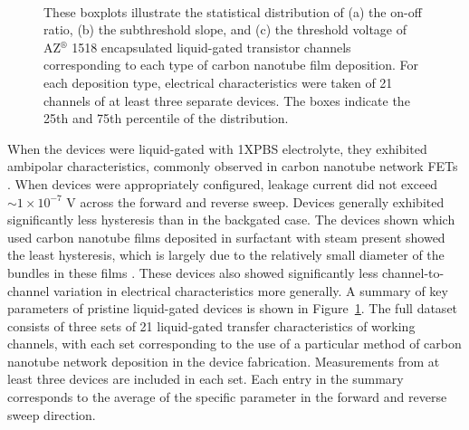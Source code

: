 \documentclass[
  a4paper,
]{scrbook}
\begin{document}
\begin{figure}
\begin{minipage}[t]{0.47\linewidth}
{{}

}

\subcaption{\label{fig-threshold-voltage}}
\end{minipage}%
%
\begin{minipage}[t]{0.26\linewidth}

{\centering 

~

}

\end{minipage}%

\caption{\label{fig-sweep-parameters}These boxplots illustrate the
statistical distribution of (a) the on-off ratio, (b) the subthreshold
slope, and (c) the threshold voltage of AZ\(^\circledR\) 1518
encapsulated liquid-gated transistor channels corresponding to each type
of carbon nanotube film deposition. For each deposition type, electrical
characteristics were taken of 21 channels of at least three separate
devices. The boxes indicate the 25th and 75th percentile of the
distribution.}

\end{figure}

When the devices were liquid-gated with 1XPBS electrolyte, they
exhibited ambipolar characteristics, commonly observed in carbon
nanotube network FETs
\autocite{Kauffman2008,Heller2009,JongYu2009,Derenskyi2014,Murugathas2018,Albarghouthi2022}.
When devices were appropriately configured, leakage current did not
exceed \(\sim 1 \times 10^{-7}\) V across the forward and reverse sweep.
Devices generally exhibited significantly less hysteresis than in the
backgated case. The devices shown which used carbon nanotube films
deposited in surfactant with steam present showed the least hysteresis,
which is largely due to the relatively small diameter of the bundles in
these films \autocite{Pop2009}. These devices also showed significantly
less channel-to-channel variation in electrical characteristics more
generally. A summary of key parameters of pristine liquid-gated devices
is shown in Figure~\ref{fig-sweep-parameters}. The full dataset consists
of three sets of 21 liquid-gated transfer characteristics of working
channels, with each set corresponding to the use of a particular method
of carbon nanotube network deposition in the device fabrication.
Measurements from at least three devices are included in each set. Each
entry in the summary corresponds to the average of the specific
parameter in the forward and reverse sweep direction.
\end{document}
